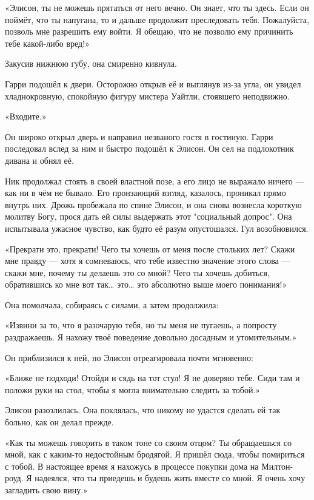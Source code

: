 \documentclass[a4paper,12pt]{book}
\begin{document}
\par
«Элисон, ты не можешь прятаться от него вечно. Он знает, что ты здесь. Если он поймёт, что ты напугана, то и дальше продолжит преследовать тебя. Пожалуйста, позволь мне разрешить ему войти. Я обещаю, что не позволю ему причинить тебе какой-либо вред!»
\par
Закусив нижнюю губу, она смиренно кивнула.
\par
Гарри подошёл к двери. Осторожно открыв её и выглянув из-за угла, он увидел хладнокровную, спокойную фигуру мистера Уайтли, стоявшего неподвижно.\\
\par
«Входите.»
\par
Он широко открыл дверь и направил незваного гостя в гостиную. Гарри последовал вслед за ним и быстро подошёл к Элисон. Он сел на подлокотник дивана и обнял её.
\par
Ник продолжал стоять в своей властной позе, а его лицо не выражало ничего — как ни в чём не бывало. Его пронзающий взгляд, казалось, проникал прямо внутрь них. Дрожь пробежала по спине Элисон, и она снова вознесла короткую молитву Богу, прося дать ей силы выдержать этот "социальный допрос". Она испытывала ужасное чувство, как будто её разум опустошался. Гул возобновился.
\par
«Прекрати это, прекрати! Чего ты хочешь от меня после стольких лет? Скажи мне правду — хотя я сомневаюсь, что тебе известно значение этого слова — скажи мне, почему ты делаешь это со мной? Чего ты хочешь добиться, обратившись ко мне вот так… это… это абсолютно выше моего понимания!»
\par
Она помолчала, собираясь с силами, а затем продолжила:
\par
«Извини за то, что я разочарую тебя, но ты меня не пугаешь, а попросту раздражаешь. Я нахожу твоё поведение довольно досадным и утомительным.»
\par
Он приблизился к ней, но Элисон отреагировала почти мгновенно:
\par
«Ближе не подходи! Отойди и сядь на тот стул! Я не доверяю тебе. Сиди там и положи руки на стол, чтобы я могла внимательно следить за тобой.»
\par
Элисон разозлилась. Она поклялась, что никому не удастся сделать ей так больно, как он делал прежде.
\par
«Как ты можешь говорить в таком тоне со своим отцом? Ты обращаешься со мной, как с каким-то недостойным бродягой. Я пришёл сюда, чтобы помириться с тобой. В настоящее время я нахожусь в процессе покупки дома на Милтон-роуд. Я надеялся, что ты приедешь и будешь жить вместе со мной. Я очень хочу загладить свою вину.»
\end{document}
